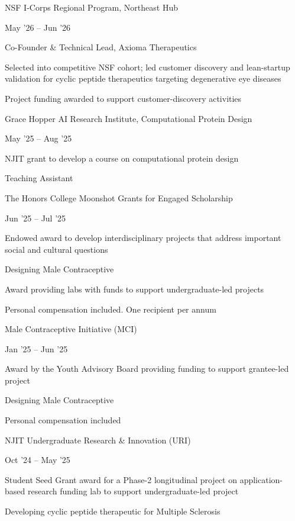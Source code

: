 \documentclass[10pt,a4paper]{article}
\newlength{\entrygap}\setlength{\entrygap}{5pt}
\newcommand{\entry}[2]{%
  \par\vspace{\entrygap}%
  \noindent
  \begin{minipage}[t]{0.795\textwidth}\raggedright #1\end{minipage}%
  \hfill
  \begin{minipage}[t]{0.19\textwidth}\raggedleft\small #2\end{minipage}%
  \par\penalty500
}
\begin{document}
\entry{NSF I-Corps Regional Program, Northeast Hub}{May '26 -- Jun '26}
\begin{cvitems}
  \item Co-Founder \& Technical Lead, Axioma Therapeutics
  \item Selected into competitive NSF cohort; led customer discovery and lean-startup validation for cyclic peptide therapeutics targeting degenerative eye diseases
  \item Project funding awarded to support customer-discovery activities
\end{cvitems}

\entry{Grace Hopper AI Research Institute, Computational Protein Design}{May '25 -- Aug '25}
\begin{cvitems}
  \item NJIT grant to develop a course on computational protein design
  \item Teaching Assistant
\end{cvitems}

\entry{The Honors College Moonshot Grants for Engaged Scholarship}{Jun '25 -- Jul '25}
\begin{cvitems}
  \item Endowed award to develop interdisciplinary projects that address important social and cultural questions
  \item Designing Male Contraceptive
  \item Award providing labs with funds to support undergraduate-led projects
  \item Personal compensation included. One recipient per annum
\end{cvitems}

\entry{Male Contraceptive Initiative (MCI)}{Jan '25 -- Jun '25}
\begin{cvitems}
  \item Award by the Youth Advisory Board providing funding to support grantee-led project
  \item Designing Male Contraceptive
  \item Personal compensation included
\end{cvitems}

\entry{NJIT Undergraduate Research \& Innovation (URI)}{Oct '24 -- May '25}
\begin{cvitems}
  \item Student Seed Grant award for a Phase-2 longitudinal project on application-based research funding lab to support undergraduate-led project
  \item Developing cyclic peptide therapeutic for Multiple Sclerosis
\end{cvitems}
\end{document}
